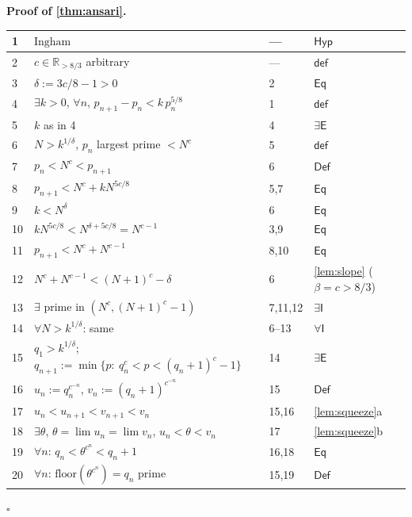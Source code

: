 \documentclass[11pt,reqno]{amsart}
\theoremstyle{blueplain}
\renewcommand{\qedsymbol}{\textcolor{proofqed}{\ensuremath{\square}}}
\renewenvironment{proof}[1][Proof]{\par\noindent\textbf{\textcolor{proofhead}{#1.}}\par\nobreak}{\par\nobreak\hfill\qedsymbol}
\numberwithin{equation}{section}
\begin{document}
\begin{proof}[\textbf{Proof of \cref{thm:ansari}}]
	\label{proof:ansari}
	{\scriptsize
		\begin{tabular}{|m{0.7cm}|m{12cm}|m{1.4cm}|m{2.5cm}|}
			\hline
			1 & $\text{Ingham}$ & --- & $\mathsf{Hyp}$ \\ \hline
			2 & $c\in\mathbb{R}_{>8/3}$ arbitrary & --- & $\mathsf{def}$ \\ \hline
			3 & $\delta:=3c/8-1>0$ & 2 & $\mathsf{Eq}$ \\ \hline
			4 & $\exists k>0$, $\forall n$, $p_{n+1}-p_n<k\,p_n^{5/8}$ & 1 & $\mathsf{def}$ \\ \hline
			5 & $k$ as in 4 & 4 & $\exists\mathsf{E}$ \\ \hline
			6 & $N>k^{1/\delta}$, $p_n$ largest prime $<N^{c}$ & 5 & $\mathsf{def}$ \\ \hline
			7 & $p_n<N^{c}<p_{n+1}$ & 6 & $\mathsf{Def}$ \\ \hline
			8 & $p_{n+1}<N^{c}+k N^{5c/8}$ & 5,7 & $\mathsf{Eq}$ \\ \hline
			9 & $k<N^{\delta}$ & 6 & $\mathsf{Eq}$ \\ \hline
			10 & $k N^{5c/8}<N^{\delta+5c/8}=N^{c-1}$ & 3,9 & $\mathsf{Eq}$ \\ \hline
			11 & $p_{n+1}<N^{c}+N^{c-1}$ & 8,10 & $\mathsf{Eq}$ \\ \hline
			12 & $N^{c}+N^{c-1}<(N+1)^{c}-\delta$ & 6 & \cref{lem:slope} ($\beta=c>8/3$) \\ \hline
			13 & $\exists$ prime in $(N^{c},(N+1)^{c}-1)$ & 7,11,12 & $\exists\mathsf{I}$ \\ \hline
			14 & $\forall N>k^{1/\delta}$: same & 6--13 & $\forall\mathsf{I}$ \\ \hline
			15 & $q_1>k^{1/\delta}$; $q_{n+1}:=\min\{p:\ q_n^{c}<p<(q_n+1)^{c}-1\}$ & 14 & $\exists\mathsf{E}$ \\ \hline
			16 & $u_n:=q_n^{c^{-n}}$, $v_n:=(q_n+1)^{c^{-n}}$ & 15 & $\mathsf{Def}$ \\ \hline
			17 & $u_n<u_{n+1}<v_{n+1}<v_n$ & 15,16 & \cref{lem:squeeze}a \\ \hline
			18 & $\exists\theta$, $\theta=\lim u_n=\lim v_n$, $u_n<\theta<v_n$ & 17 & \cref{lem:squeeze}b \\ \hline
			19 & $\forall n$: $q_n<\theta^{c^{n}}<q_n+1$ & 16,18 & $\mathsf{Eq}$ \\ \hline
			20 & $\forall n$: $\mathrm{floor}(\theta^{c^{n}})=q_n$ prime & 15,19 & $\mathsf{Def}$ \\ \hline

\end{tabular}}
\end{proof}
\end{document}
